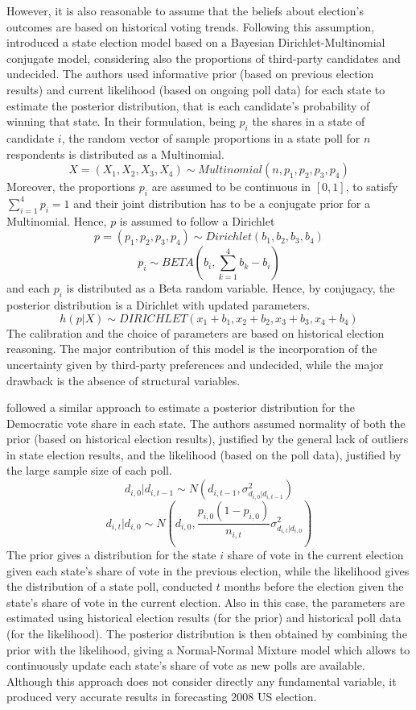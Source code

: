 \documentclass[
  12pt]{article}
\begin{document}
However, it is also reasonable to assume that the beliefs about
election's outcomes are based on historical voting trends. Following
this assumption, \citet{rig:2009} introduced a state election model
based on a Bayesian Dirichlet-Multinomial conjugate model, considering
also the proportions of third-party candidates and undecided. The
authors used informative prior (based on previous election results) and
current likelihood (based on ongoing poll data) for each state to
estimate the posterior distribution, that is each candidate's
probability of winning that state. In their formulation, being \(p_i\)
the shares in a state of candidate \(i\), the random vector of sample
proportions in a state poll for \(n\) respondents is distributed as a
Multinomial.
\[X = (X_1, X_2, X_3, X_4) \sim Multinomial(n, p_1, p_2, p_3, p_4)\]
Moreover, the proportions \(p_i\) are assumed to be continuous in
\([0,1]\), to satisfy \(\sum_{i = 1}^{4} p_i = 1\) and their joint
distribution has to be a conjugate prior for a Multinomial. Hence, \(p\)
is assumed to follow a Dirichlet
\[p = (p_1, p_2, p_3, p_4) \sim Dirichlet(b_1, b_2, b_3, b_4)\]
\[p_i \sim BETA(b_i, \sum_{k = 1}^{4} b_k - b_i)\] and each \(p_i\) is
distributed as a Beta random variable. Hence, by conjugacy, the
posterior distribution is a Dirichlet with updated parameters.
\[h(p|X) \sim DIRICHLET(x_1 + b_1, x_2 + b_2, x_3 + b_3, x_4 + b_4)\]
The calibration and the choice of parameters are based on historical
election reasoning. The major contribution of this model is the
incorporation of the uncertainty given by third-party preferences and
undecided, while the major drawback is the absence of structural
variables.

\citep{loc:gel:2010} followed a similar approach to estimate a posterior
distribution for the Democratic vote share in each state. The authors
assumed normality of both the prior (based on historical election
results), justified by the general lack of outliers in state election
results, and the likelihood (based on the poll data), justified by the
large sample size of each poll.
\[d_{i,0}|d_{i,t-1} \sim N(d_{i,t-1}, \sigma^2_{d_{i,0}|d_{i,t-1}})\]
\[d_{i,t}|d_{i,0} \sim N(d_{i,0}, \frac{p_{i,0}(1-p_{i,0})}{n_{i,t}} \sigma^2_{d_{i,t}|d_{i,0}})\]
The prior gives a distribution for the state \(i\) share of vote in the
current election given each state's share of vote in the previous
election, while the likelihood gives the distribution of a state poll,
conducted \(t\) months before the election given the state's share of
vote in the current election. Also in this case, the parameters are
estimated using historical election results (for the prior) and
historical poll data (for the likelihood). The posterior distribution is
then obtained by combining the prior with the likelihood, giving a
Normal-Normal Mixture model which allows to continuously update each
state's share of vote as new polls are available. Although this approach
does not consider directly any fundamental variable, it produced very
accurate results in forecasting 2008 US election.
\end{document}
